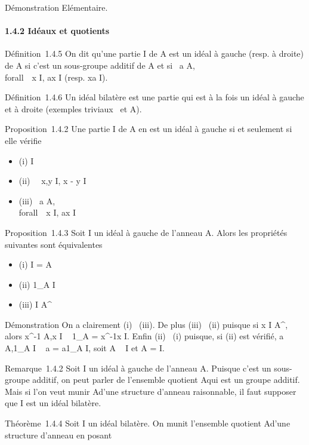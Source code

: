 \documentclass[]{article}
\begin{document}
Démonstration Elémentaire.

\paragraph{1.4.2 Idéaux et quotients}

Définition~1.4.5 On dit qu'une partie I de A est un idéal à gauche
(resp. à droite) de A si c'est un sous-groupe additif de A et si
\forall~a \in A,\\forall~~x \in I, ax \in
I (resp. xa \in I).

Définition~1.4.6 Un idéal bilatère est une partie qui est à la fois un
idéal à gauche et à droite (exemples triviaux
\0\ et A).

Proposition~1.4.2 Une partie I de A en est un idéal à gauche si et
seulement si elle vérifie

\begin{itemize}
\itemsep1pt\parskip0pt
\item
  (i) I\neq~\varnothing~
\item
  (ii) \forall~~x,y \in I, x - y \in I
\item
  (iii) \forall~a \in A,\\forall~~x \in
  I, ax \in I
\end{itemize}

Proposition~1.4.3 Soit I un idéal à gauche de l'anneau A. Alors les
propriétés suivantes sont équivalentes

\begin{itemize}
\itemsep1pt\parskip0pt
\item
  (i) I = A
\item
  (ii) 1_A \in I
\item
  (iii) I \bigcap A^\times\neq~\varnothing~
\end{itemize}

Démonstration On a clairement (i) \rigtharrow~(iii). De plus (iii) \rigtharrow~(ii) puisque si
x \in I \bigcap A^\times, alors x^-1 \in A,x \in I \rigtharrow~ 1_A =
x^-1x \in I. Enfin (ii) \rigtharrow~(i) puisque, si (ii) est vérifié, a \in
A,1_A \in I \rigtharrow~ a = a1_A \in I, soit A \subset~ I et A = I.

Remarque~1.4.2 Soit I un idéal à gauche de l'anneau A. Puisque c'est un
sous-groupe additif, on peut parler de l'ensemble quotient A\diagupI qui est
un groupe additif. Mais si l'on veut munir A\diagupI d'une structure d'anneau
raisonnable, il faut supposer que I est un idéal bilatère.

Théorème~1.4.4 Soit I un idéal bilatère. On munit l'ensemble quotient
A\diagupI d'une structure d'anneau en posant
\end{document}
